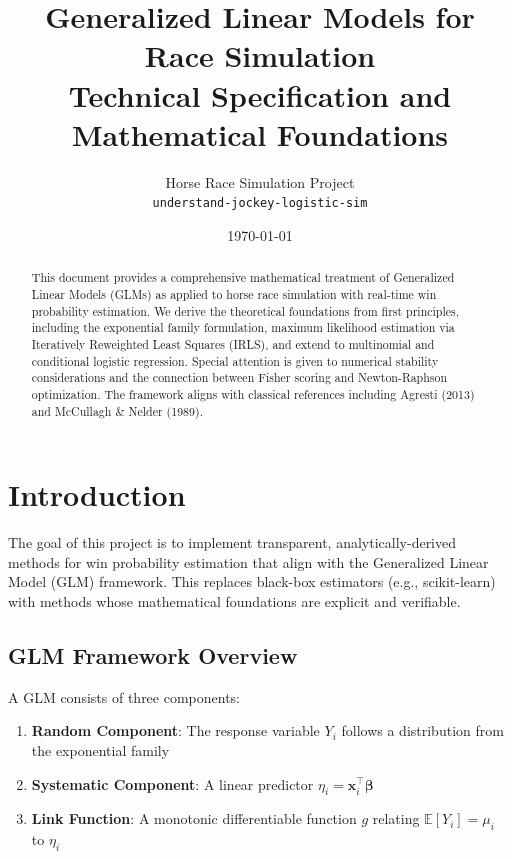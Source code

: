 \documentclass[11pt,letterpaper]{article}
\title{
    \textbf{Generalized Linear Models for Race Simulation} \\[0.5em]
    \large Technical Specification and Mathematical Foundations
}
\author{
    Horse Race Simulation Project \\
    \texttt{understand-jockey-logistic-sim}
}
\date{\today}
\theoremstyle{definition}
\newcommand{\E}{\mathbb{E}}
\newcommand{\bb}{\boldsymbol{\beta}}
\begin{document}

\maketitle

\begin{abstract}
This document provides a comprehensive mathematical treatment of Generalized Linear Models (GLMs) as applied to horse race simulation with real-time win probability estimation. We derive the theoretical foundations from first principles, including the exponential family formulation, maximum likelihood estimation via Iteratively Reweighted Least Squares (IRLS), and extend to multinomial and conditional logistic regression. Special attention is given to numerical stability considerations and the connection between Fisher scoring and Newton-Raphson optimization. The framework aligns with classical references including Agresti (2013) and McCullagh \& Nelder (1989).
\end{abstract}

\tableofcontents
\newpage

\section{Introduction}

The goal of this project is to implement transparent, analytically-derived methods for win probability estimation that align with the Generalized Linear Model (GLM) framework. This replaces black-box estimators (e.g., scikit-learn) with methods whose mathematical foundations are explicit and verifiable.

\subsection{GLM Framework Overview}

A GLM consists of three components:
\begin{enumerate}
    \item \textbf{Random Component}: The response variable $Y_i$ follows a distribution from the exponential family
    \item \textbf{Systematic Component}: A linear predictor $\eta_i = \mathbf{x}_i^\top \bb$
    \item \textbf{Link Function}: A monotonic differentiable function $g$ relating $\E[Y_i] = \mu_i$ to $\eta_i$
\end{enumerate}
\end{document}
